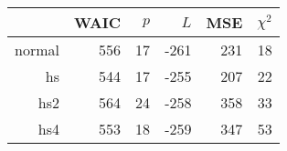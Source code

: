 \begin{tabular}{rrrrrr}
  \hline
 & WAIC & $p$ & $L$ & MSE & $\chi^2$ \\ 
  \hline
normal & 556 & 17 & -261 & 231 & 18 \\ 
  hs & 544 & 17 & -255 & 207 & 22 \\ 
  hs2 & 564 & 24 & -258 & 358 & 33 \\ 
  hs4 & 553 & 18 & -259 & 347 & 53 \\ 
   \hline
\end{tabular}
